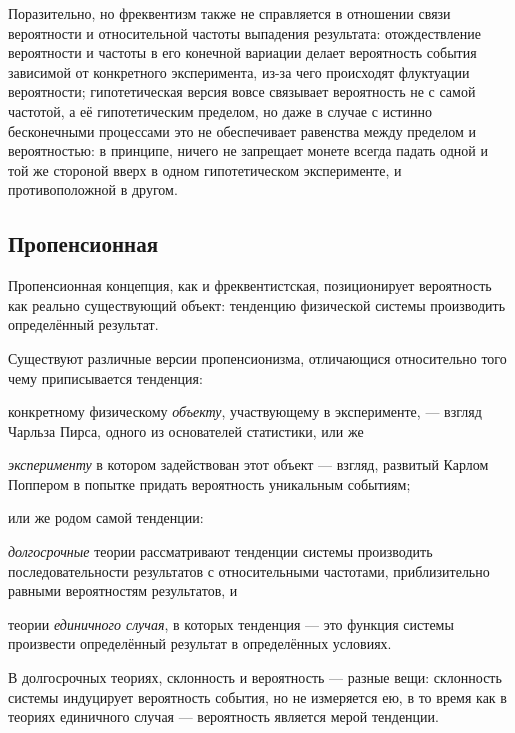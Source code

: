 \documentclass[14pt, a4paper, pdftex]{extarticle}
\begin{document}
Поразительно, но фреквентизм также не справляется в отношении связи вероятности и относительной частоты выпадения результата: отождествление вероятности и частоты в его конечной вариации делает вероятность события зависимой от конкретного эксперимента, из-за чего происходят флуктуации вероятности; гипотетическая версия вовсе связывает вероятность не с самой частотой, а её гипотетическим пределом, но даже в случае с истинно бесконечными процессами это не обеспечивает равенства между пределом и вероятностью: в принципе, ничего не запрещает монете всегда падать одной и той же стороной вверх в одном гипотетическом эксперименте, и противоположной в другом.


\subsection{Пропенсионная}

Пропенсионная концепция, как и фреквентистская, позиционирует вероятность как реально существующий объект: тенденцию физической системы производить определённый результат.

Существуют различные версии пропенсионизма, отличающися относительно того чему приписывается тенденция: 
\begin{inparaenum}[1)]
\item конкретному физическому \emph{объекту}, участвующему в эксперименте, --- взгляд Чарльза Пирса, одного из основателей статистики, или же
\item \emph{эксперименту} в котором задействован этот объект --- взгляд, развитый Карлом Поппером в попытке придать вероятность уникальным событиям;
\end{inparaenum}
или же родом самой тенденции:
\begin{inparaenum}[1)]
\item \emph{долгосрочные} теории рассматривают тенденции системы производить последовательности результатов с относительными частотами, приблизительно равными вероятностям результатов, и 
\item теории \emph{единичного случая}, в которых тенденция --- это функция системы произвести определённый результат в определённых условиях. 
\end{inparaenum}

В долгосрочных теориях, склонность и вероятность --- разные вещи: склонность системы индуцирует вероятность события, но не измеряется ею, в то время как в теориях единичного случая --- вероятность является мерой тенденции.
\end{document}
